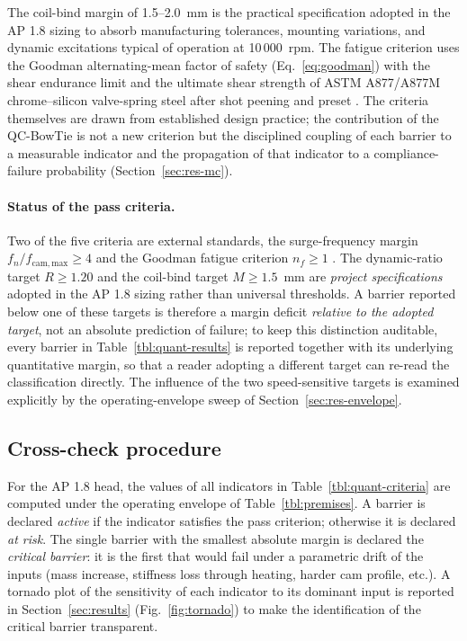 The coil-bind margin of 1.5--2.0~mm is the
practical specification adopted in the AP 1.8 sizing to absorb
manufacturing tolerances, mounting variations, and dynamic excitations
typical of operation at 10\,000~rpm. The fatigue criterion uses the Goodman alternating-mean factor of
safety (Eq.~\ref{eq:goodman}) with the shear endurance limit and the
ultimate shear strength of ASTM A877/A877M chrome--silicon
valve-spring steel after shot peening and preset
\citep{shigley2020,xing2021valvespringEAC,ko2022springfatigueflaws}.
The criteria themselves are drawn from established design practice; the
contribution of the QC-BowTie is not a new criterion but the disciplined
coupling of each barrier to a measurable indicator and the propagation of
that indicator to a compliance-failure probability
(Section~\ref{sec:res-mc}).

\paragraph{Status of the pass criteria.} Two of the five criteria are
external standards, the surge-frequency margin
$f_{n}/f_{\mathrm{cam,max}}\geq 4$ \citep{heywood1988} and the Goodman
fatigue criterion $n_{f}\geq 1$ \citep{shigley2020}. The dynamic-ratio
target $R\geq 1.20$ and the coil-bind target $M\geq 1.5$~mm are
\emph{project specifications} adopted in the AP 1.8 sizing rather than
universal thresholds. A barrier reported below one of these targets is
therefore a margin deficit \emph{relative to the adopted target}, not an
absolute prediction of failure; to keep this distinction auditable, every
barrier in Table~\ref{tbl:quant-results} is reported together with its
underlying quantitative margin, so that a reader adopting a different
target can re-read the classification directly. The influence of the two
speed-sensitive targets is examined explicitly by the operating-envelope
sweep of Section~\ref{sec:res-envelope}.

\subsection{Cross-check procedure}\label{sec:method-cross-check}

For the AP 1.8 head, the values of all indicators in
Table~\ref{tbl:quant-criteria} are computed under the operating envelope
of Table~\ref{tbl:premises}. A barrier is declared \emph{active} if the
indicator satisfies the pass criterion; otherwise it is declared
\emph{at risk}. The single barrier with the smallest absolute margin is
declared the \emph{critical barrier}: it is the first that would fail
under a parametric drift of the inputs (mass increase, stiffness loss
through heating, harder cam profile, etc.). A tornado plot of the
sensitivity of each indicator to its dominant input is reported in
Section~\ref{sec:results} (Fig.~\ref{fig:tornado}) to make the
identification of the critical barrier transparent.

